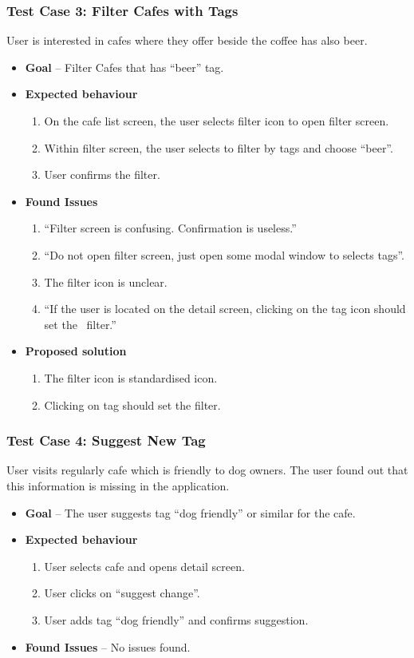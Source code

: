 \subsubsection{Test Case 3: Filter Cafes with Tags}
User is interested in cafes where they offer beside the coffee has also beer.
\begin{itemize}
    \item \textbf{Goal} -- Filter Cafes that has ``beer'' tag.
    \item \textbf{Expected behaviour}
    \begin{enumerate}
        \item On the cafe list screen, the user selects filter icon to open filter screen.
        \item Within filter screen, the user selects to filter by tags and choose ``beer''.
        \item User confirms the filter. 
    \end{enumerate}
    \item \textbf{Found Issues}
    \begin{enumerate}
        \item ``Filter screen is confusing. Confirmation is useless.''
        \item ``Do not open filter screen, just open some modal window to selects tags''.
        \item The filter icon is unclear.
        \item ``If the user is located on the detail screen, clicking on the tag icon should set the~ filter.'' 
    \end{enumerate}
    \item \textbf{Proposed solution}
    \begin{enumerate}
        \item The filter icon is standardised icon. 
        \item Clicking on tag should set the filter. 
    \end{enumerate}
\end{itemize}

\subsubsection{Test Case 4: Suggest New Tag}
User visits regularly cafe which is friendly to dog owners. The user found out that this information is missing in the application. 
\begin{itemize}
    \item \textbf{Goal} -- The user suggests tag ``dog friendly'' or similar for the cafe. 
    \item \textbf{Expected behaviour}
    \begin{enumerate}
        \item User selects cafe and opens detail screen.
        \item User clicks on ``suggest change''.
        \item User adds tag ``dog friendly'' and confirms suggestion.
    \end{enumerate}
    \item \textbf{Found Issues} -- No issues found.
\end{itemize}

